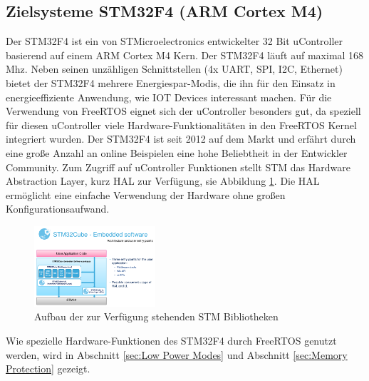 \subsection{Zielsysteme STM32F4 (ARM Cortex M4)}
Der STM32F4 ist ein von STMicroelectronics entwickelter 32 Bit uController basierend auf einem ARM Cortex M4 Kern. Der STM32F4 läuft auf maximal 168 Mhz. Neben seinen unzähligen Schnittstellen (4x UART, SPI, I2C, Ethernet) bietet der STM32F4 mehrere Energiespar-Modis, die ihn für den Einsatz in energieeffiziente Anwendung, wie IOT Devices interessant machen. Für die Verwendung von FreeRTOS eignet sich der uController besonders gut, da speziell für diesen uController viele Hardware-Funk\-tio\-na\-li\-tät\-en in den FreeRTOS Kernel integriert wurden. Der STM32F4 ist seit 2012 auf dem Markt und erfährt durch eine große Anzahl an online Beispielen eine hohe Beliebtheit in der Entwickler Community. Zum Zugriff auf uController Funktionen stellt STM das Hardware Abstraction Layer, kurz HAL zur Verfügung, sie Abbildung \ref{fig:HAL}. Die HAL ermöglicht eine einfache Verwendung der Hardware ohne großen Konfigurationsaufwand.     
\begin{figure}[htb!]
	\centering
		\includegraphics[width=0.4\textwidth]{Pictures/STM32F4/LibraryEntry.png}
	\caption{Aufbau der zur Verfügung stehenden STM Bibliotheken }
	\label{fig:HAL}
\end{figure}
Wie spezielle Hardware-Funktionen des STM32F4 durch FreeRTOS genutzt werden, wird in Abschnitt \ref{sec:Low Power Modes} und Abschnitt \ref{sec:Memory Protection} gezeigt.